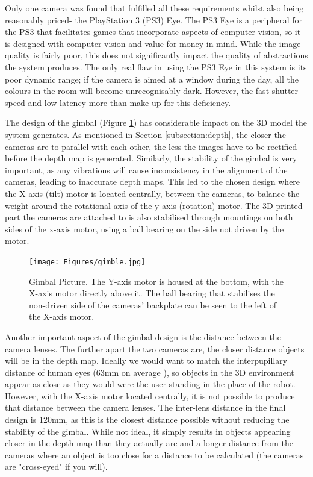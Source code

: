 Only one camera was found that fulfilled all these requirements whilst also being reasonably priced- the PlayStation 3 (PS3) Eye. The PS3 Eye is a peripheral for the PS3 that facilitates games that incorporate aspects of computer vision, so it is designed with computer vision and value for money in mind. While the image quality is fairly poor, this does not significantly impact the quality of abstractions the system produces. The only real flaw in using the PS3 Eye in this system is its poor dynamic range; if the camera is aimed at a window during the day, all the colours in the room will become unrecognisably dark. However, the fast shutter speed and low latency more than make up for this deficiency.

The design of the gimbal (Figure \ref{fig:gimble}) has considerable impact on the 3D model the system generates. As mentioned in Section \ref{subsection:depth}, the closer the cameras are to parallel with each other, the less the images have to be rectified before the depth map is generated. Similarly, the stability of the gimbal is very important, as any vibrations will cause inconsistency in the alignment of the cameras, leading to inaccurate depth maps. This led to the chosen design where the X-axis (tilt) motor is located centrally, between the cameras, to balance the weight around the rotational axis of the y-axis (rotation) motor. The 3D-printed part the cameras are attached to is also stabilised through mountings on both sides of the x-axis motor, using a ball bearing on the side not driven by the motor. 

\begin{figure}[H]
    \begin{center}
      \texttt{[image: Figures/gimble.jpg]}
      \caption[Gimbal Picture]{Gimbal Picture. The Y-axis motor is housed at the bottom, with the X-axis motor directly above it. The ball bearing that stabilises the non-driven side of the cameras' backplate can be seen to the left of the X-axis motor.}
      \label{fig:gimble}
    \end{center}
\end{figure}

Another important aspect of the gimbal design is the distance between the camera lenses. The further apart the two cameras are, the closer distance objects will be in the depth map. Ideally we would want to match the interpupillary distance of human eyes (63mm on average \cite{dodgson2004variation}), so objects in the 3D environment appear as close as they would were the user standing in the place of the robot. However, with the X-axis motor located centrally, it is not possible to produce that distance between the camera lenses. The inter-lens distance in the final design is 120mm, as this is the closest distance possible without reducing the stability of the gimbal. While not ideal, it simply results in objects appearing closer in the depth map than they actually are and a longer distance from the cameras where an object is too close for a distance to be calculated (the cameras are "cross-eyed" if you will).

